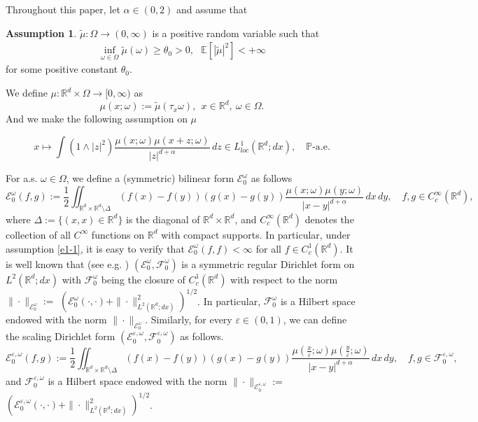 \documentclass[11pt,draft, reqno]{amsart}
\renewcommand{\ge}{\geqslant}
\def\EE{{\mathcal E}}
\def\FF{{\mathcal F}}
\newcommand{\E}{\mathcal{E}}
\newcommand{\R}{\mathds R}
\newcommand{\e}{\varepsilon}
\newcommand{\Pp}{\mathds P}
\newcommand{\Ee}{\mathds E}
\newcommand{\w}{\omega}
\theoremstyle{definition}
\newtheorem{assumption}[theorem]{Assumption}
\numberwithin{equation}{section}
\begin{document}
\medskip

 Throughout this paper, let $\alpha\in (0,2)$ and assume that
\begin{assumption}\label{a1-1}
$\tilde \mu: \Omega\rightarrow (0,\infty)$ is
 a positive random variable such that
\begin{align*}
\inf_{\w\in \Omega}\tilde \mu(\w)\ge \theta_0>0,\ \ \ \Ee[|\tilde \mu|^2]<+\infty
\end{align*}
for some positive constant $\theta_0$.
\end{assumption}

We define $\mu:\R^d\times \Omega \to [0,\infty)$ as
\begin{equation*}
\mu(x;\w):=\tilde \mu(\tau_x \w),\ \ x\in \R^d,\ \w\in \Omega.
\end{equation*}
And we make the following assumption on $\mu$

\begin{equation}\label{e1-1}
x\mapsto \int (1\wedge |z|^2)\frac{\mu(x;\w)\mu(x+z;\w)}{|z|^{d+\alpha}}\,dz \in L^1_{loc}(\R^d;dx),
\quad \mbox{$\Pp$-a.e.}
\end{equation}

For a.s. $\w\in \Omega$, we define a (symmetric) bilinear form $\EE_0^\w$ as follows
\begin{equation}\label{e1-2}
\EE_0^\w(f,g):=\frac{1}{2}
\iint_{\R^d\times\R^d\setminus \Delta}
(f(x)-f(y))(g(x)-g(y))\frac{\mu(x;\w)\mu(y;\w)}{|x-y|^{d+\alpha}}
\,dx\,dy,\quad f,g\in C_c^\infty(\R^d),
\end{equation}
where $\Delta:=\{(x,x)\in \R^d\}$ is the diagonal of $\R^d \times \R^d$, and $C_c^\infty(\R^d)$ denotes the collection
of all $C^\infty$ functions on $\R^d$ with compact supports. In particular,
under assumption
 \eqref{e1-1}, it is easy to verify that $\EE_0^\w(f,f)<\infty$ for all $f\in C_c^1 (\R^d)$.
It is well known that (see e.g. \cite{FOT}) $(\EE_0^\w,\FF_0^\w)$ is a symmetric regular
Dirichlet form on $L^2(\R^d; dx)$ with $\FF_0^\w$
 being the closure of $C_c^1(\R^d)$ with respect to the norm $\|\cdot\|_{\E_0^\w}:=$ $(\E_0^\w(\cdot,\cdot)+\|\cdot\|_{L^2(\R^d; dx)}^2)^{1/2}$.
In particular, $\FF^\w_0$ is a Hilbert space endowed with the norm $\|\cdot\|_{\EE_0^\w}$.
Similarly, for every $\e\in (0,1)$, we can define the scaling Dirichlet form $(\E^{\e,\w}_{0},\FF_0^{\e,\w})$ as follows.
\begin{equation}\label{e1-3}
\EE_0^{\e,\w}(f,g):=\frac{1}{2}
\iint_{\R^d\times\R^d\setminus \Delta}
(f(x)-f(y))(g(x)-g(y))\frac{\mu\left(\frac{x}{\e};\w\right)\mu\left(\frac{y}{\e};\w\right)}{|x-y|^{d+\alpha}}
\,dx\,dy,\quad f,g\in \FF_0^{\e,\w},
\end{equation}
and $\FF_0^{\e,\w}$ is a Hilbert space endowed with the norm $\|\cdot\|_{\EE_0^{\e,\w}}:=$
$(\E_0^{\e,\w}(\cdot,\cdot)+\|\cdot\|_{L^2(\R^d; dx)}^2)^{1/2}$.
\end{document}
